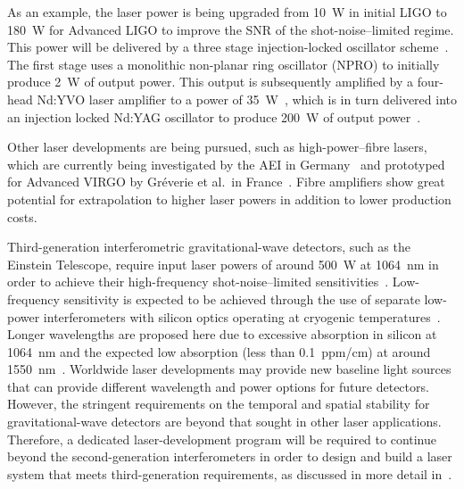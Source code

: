 As an example, the laser power is being upgraded from 10~W in initial LIGO to
180~W for Advanced LIGO to improve the SNR of the shot-noise--limited regime.
This power will be delivered by a three stage injection-locked oscillator
scheme~\cite{Cregut, Nabors, Golla, Frede:2005}.  The first stage uses a
monolithic non-planar ring oscillator (NPRO) to initially produce 2~W of output
power.  This output is subsequently amplified by a four-head Nd:YVO laser
amplifier to a power of 35~W~\cite{Frede:2007}, which is in turn delivered into
an injection locked Nd:YAG oscillator to produce 200~W of output
power~\cite{Wilke:2008}.


Other laser developments are being pursued, such as high-power--fibre
lasers, which are currently being investigated by the AEI in
Germany~\cite{Schnabel:2010} and prototyped for Advanced VIRGO by
Gr\'{e}verie et al.\ in France~\cite{Greverie:2010}. Fibre amplifiers
show great potential for extrapolation to higher laser powers in
addition to lower production costs.


Third-generation interferometric gravitational-wave detectors, such as the
Einstein Telescope, require input laser powers of around 500~W at 1064~nm in
order to achieve their high-frequency shot-noise--limited
sensitivities~\cite{Hild:2010}.  Low-frequency sensitivity is expected to be
achieved through the use of separate low-power interferometers with silicon
optics operating at cryogenic temperatures~\cite{Rowan:2003, Punturo:2010}.
Longer wavelengths are proposed here due to excessive absorption in silicon at
1064~nm and the expected low absorption (less than 0.1~ppm/cm) at
around 1550~nm~\cite{Green:1995}. Worldwide laser developments may
provide new baseline light sources that can provide different
wavelength and power options for future detectors. However, the
stringent requirements on the temporal and spatial stability for
gravitational-wave detectors are beyond that sought in other laser
applications. Therefore, a dedicated laser-development program will be
required to continue beyond the second-generation interferometers in
order to design and build a laser system that meets third-generation
requirements, as discussed in more detail in~\cite{Mavalvala:2010}.


